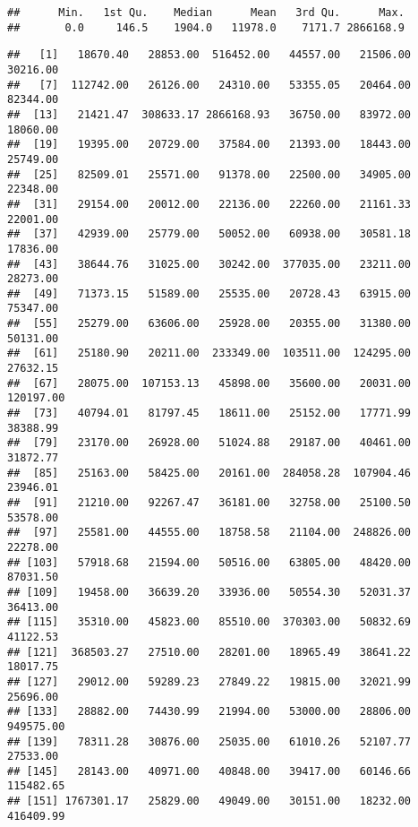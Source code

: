 \documentclass[
]{article}
\newenvironment{Shaded}{\begin{snugshade}}{\end{snugshade}}
\newcommand{\KeywordTok}[1]{\textcolor[rgb]{0.13,0.29,0.53}{\textbf{#1}}}
\newcommand{\NormalTok}[1]{#1}
\newcommand{\OperatorTok}[1]{\textcolor[rgb]{0.81,0.36,0.00}{\textbf{#1}}}
\begin{document}
\begin{verbatim}
##      Min.   1st Qu.    Median      Mean   3rd Qu.      Max. 
##       0.0     146.5    1904.0   11978.0    7171.7 2866168.9
\end{verbatim}

\begin{Shaded}
\end{Shaded}

\begin{verbatim}
##   [1]   18670.40   28853.00  516452.00   44557.00   21506.00   30216.00
##   [7]  112742.00   26126.00   24310.00   53355.05   20464.00   82344.00
##  [13]   21421.47  308633.17 2866168.93   36750.00   83972.00   18060.00
##  [19]   19395.00   20729.00   37584.00   21393.00   18443.00   25749.00
##  [25]   82509.01   25571.00   91378.00   22500.00   34905.00   22348.00
##  [31]   29154.00   20012.00   22136.00   22260.00   21161.33   22001.00
##  [37]   42939.00   25779.00   50052.00   60938.00   30581.18   17836.00
##  [43]   38644.76   31025.00   30242.00  377035.00   23211.00   28273.00
##  [49]   71373.15   51589.00   25535.00   20728.43   63915.00   75347.00
##  [55]   25279.00   63606.00   25928.00   20355.00   31380.00   50131.00
##  [61]   25180.90   20211.00  233349.00  103511.00  124295.00   27632.15
##  [67]   28075.00  107153.13   45898.00   35600.00   20031.00  120197.00
##  [73]   40794.01   81797.45   18611.00   25152.00   17771.99   38388.99
##  [79]   23170.00   26928.00   51024.88   29187.00   40461.00   31872.77
##  [85]   25163.00   58425.00   20161.00  284058.28  107904.46   23946.01
##  [91]   21210.00   92267.47   36181.00   32758.00   25100.50   53578.00
##  [97]   25581.00   44555.00   18758.58   21104.00  248826.00   22278.00
## [103]   57918.68   21594.00   50516.00   63805.00   48420.00   87031.50
## [109]   19458.00   36639.20   33936.00   50554.30   52031.37   36413.00
## [115]   35310.00   45823.00   85510.00  370303.00   50832.69   41122.53
## [121]  368503.27   27510.00   28201.00   18965.49   38641.22   18017.75
## [127]   29012.00   59289.23   27849.22   19815.00   32021.99   25696.00
## [133]   28882.00   74430.99   21994.00   53000.00   28806.00  949575.00
## [139]   78311.28   30876.00   25035.00   61010.26   52107.77   27533.00
## [145]   28143.00   40971.00   40848.00   39417.00   60146.66  115482.65
## [151] 1767301.17   25829.00   49049.00   30151.00   18232.00  416409.99

\end{verbatim}
\end{document}
